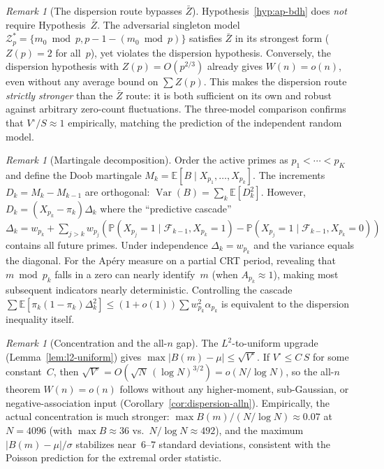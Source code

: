 \documentclass[11pt]{article}
\theoremstyle{definition}
\theoremstyle{remark}
\newtheorem{remark}[theorem]{Remark}
\begin{document}
\begin{remark}[The dispersion route bypasses $\bar{Z}$]
\label{rem:dispersion-vs-Z1}
Hypothesis~\ref{hyp:ap-bdh} does \emph{not} require
Hypothesis~$\bar{Z}$.
The adversarial singleton model
$\mathcal{Z}_p^* = \{m_0 \bmod p, p{-}1{-}(m_0 \bmod p)\}$
satisfies $\bar{Z}$ in its strongest form ($Z(p) = 2$
for all~$p$), yet violates the dispersion hypothesis.
Conversely, the dispersion hypothesis with $Z(p) = O(p^{2/3})$
already gives $W(n) = o(n)$, even without
any average bound on $\sum Z(p)$.
This makes the dispersion route \emph{strictly stronger}
than the $\bar{Z}$ route: it is both sufficient
on its own and robust against arbitrary
zero-count fluctuations.
The three-model comparison confirms that
$V^\circ/S \approx 1$ empirically,
matching the prediction of the independent random model.
\end{remark}

\begin{remark}[Martingale decomposition]\label{rem:martingale}
Order the active primes as $p_1 < \cdots < p_K$
and define the Doob martingale
$M_k = \mathbb{E}[B \mid X_{p_1},\ldots,X_{p_k}]$.
The increments $D_k = M_k - M_{k-1}$ are orthogonal:
$\operatorname{Var}(B) = \sum_k \mathbb{E}[D_k^2]$.
However, $D_k = (X_{p_k} - \pi_k)\Delta_k$
where the ``predictive cascade''
$\Delta_k = w_{p_k} + \sum_{j > k} w_{p_j}
(\mathbb{P}(X_{p_j}{=}1 \mid \mathcal{F}_{k-1}, X_{p_k}{=}1)
- \mathbb{P}(X_{p_j}{=}1 \mid \mathcal{F}_{k-1}, X_{p_k}{=}0))$
contains all future primes.
Under independence $\Delta_k = w_{p_k}$ and the
variance equals the diagonal.
For the Ap\'ery measure on a partial CRT period,
revealing that $m \bmod p_k$ falls in a zero
can nearly identify~$m$ (when $A_{p_k} \approx 1$),
making most subsequent indicators nearly
deterministic.
Controlling the cascade $\sum \mathbb{E}[\pi_k(1-\pi_k)\Delta_k^2]
\le (1+o(1))\sum w_{p_k}^2\alpha_{p_k}$
is equivalent to the dispersion inequality itself.
\end{remark}

\begin{remark}[Concentration and the all-$n$ gap]
\label{rem:concentration}
The $L^2$-to-uniform upgrade
(Lemma~\ref{lem:l2-uniform}) gives
$\max|B(m) - \mu| \le \sqrt{V^\circ}$.
If $V^\circ \le C\,S$ for some constant~$C$,
then $\sqrt{V^\circ} = O(\sqrt{N}\,(\log N)^{3/2})
= o(N/\!\log N)$, so the all-$n$
theorem $W(n) = o(n)$ follows without
any higher-moment, sub-Gaussian, or
negative-association input
(Corollary~\ref{cor:dispersion-alln}).
Empirically, the actual concentration is much stronger:
$\max B(m) / (N\!/\!\log N) \approx 0.07$ at $N = 4096$
(with $\max B \approx 36$ vs.~$N\!/\!\log N \approx 492$),
and the maximum $|B(m) - \mu|/\sigma$ stabilizes
near~$6$--$7$ standard deviations, consistent
with the Poisson prediction for the
extremal order statistic.
\end{remark}
\end{document}
